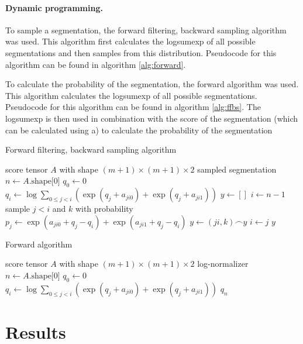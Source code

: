 \paragraph{Dynamic programming.} To sample a segmentation, the forward filtering, backward sampling algorithm  was used.
This algorithm first calculates the logsumexp of all possible segmentations and then samples from this distribution.
Pseudocode for this algorithm can be found in algorithm \ref{alg:forward}.

To calculate the probability of the segmentation, the forward algorithm was used.
This algorithm calculates the logsumexp of all possible segmentations.
Pseudocode for this algorithm can be found in algorithm \ref{alg:ffbs}.
The logsumexp is then used in combination with the score of the segmentation (which can be calculated using a) to calculate the probability of the segmentation

\begin{algorithm}
\caption{Forward filtering, backward sampling algorithm}
\label{alg:ffbs}
\begin{algorithmic}
\Require score tensor $A$ with shape $(m+1) \times (m+1) \times 2$
\Ensure sampled segmentation
\State
\State $n \gets A.\text{shape[0]}$
\State $q_0 \gets 0$
    \State $q_i \gets \log \sum_{0 \leq j < i} (\exp (q_j + a_{ji0}) + \exp (q_j + a_{ji1}))$
\EndFor
\State
\State $y \gets []$
\State $i \gets n - 1$
    \State sample $j < i$ and $k$ with probability $p_j \gets \exp (a_{ji0} + q_j - q_i) + \exp(a_{ji1} + q_j - q_i)$
    \State $y \gets (ji,k) \frown y$
    \State $i \gets j$
\EndWhile
\State
\State \Return $y$
\end{algorithmic}
\end{algorithm}

\begin{algorithm}
\caption{Forward algorithm}
\label{alg:forward}
\begin{algorithmic}
\Require score tensor $A$ with shape $(m+1) \times (m+1) \times 2$
\Ensure log-normalizer
\State
\State $n \gets A.\text{shape[0]}$
\State $q_0 \gets 0$
    \State $q_i \gets \log \sum_{0 \leq j < i} (\exp (q_j + a_{ji0}) + \exp (q_j + a_{ji1}))$
\EndFor
\State
\State \Return $q_n$
\end{algorithmic}
\end{algorithm}


\section{Results}
